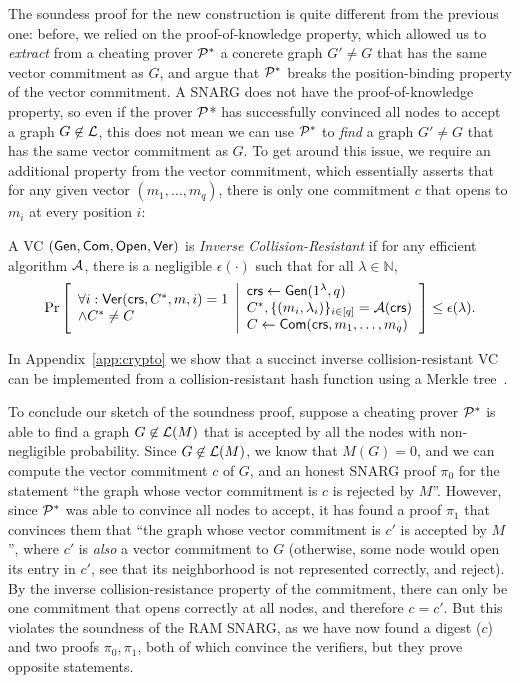 The soundess proof for the new construction is quite different from the previous one:
before, we relied on the proof-of-knowledge property, which allowed us to \emph{extract}
from a cheating prover $\mathcal{P}^*$
a concrete graph $G' \neq G$ that has the same vector commitment as $G$,
and argue that $\mathcal{P}^*$ breaks the position-binding property of the vector commitment.
A SNARG does not have the proof-of-knowledge property,
so even if the prover $\mathcal{P}$* has successfully convinced all nodes to accept a graph $G \not \in \mathcal{L}$,
this does not mean we can use $\mathcal{P}^*$ to \emph{find} a graph $G' \neq G$ that has the same vector commitment as $G$.
To get around this issue,
we require an additional property from the vector commitment,
which essentially asserts that for any given vector $(m_1,\ldots,m_q)$,
there is only one commitment $c$ that opens to $m_i$ at every position $i$:
\begin{definition}
A VC $(\mathsf{Gen}, \mathsf{Com}, \mathsf{Open}, \mathsf{Ver})$ is \emph{Inverse Collision-Resistant} if for any efficient algorithm $\mathcal{A}$, there
is a negligible $\epsilon(\cdot)$ such that for all $\lambda\in \mathbb{N}$,
\begin{gather*}
    \underset{}{\text{Pr}}\left [
    \begin{array}{ll}
         \forall i: \mathsf{Ver}(\mathsf{crs}, C^*, m, i) = 1 \\
         \wedge C^* \neq C
    \end{array}
    \middle\vert
    \begin{array}{ll}
         \mathsf{crs} \leftarrow \mathsf{Gen}(1^\lambda, q) \\
         C^*, \{(m_i, \lambda_i)\}_{i\in [q]} = \mathcal{A}(\mathsf{crs}) \\
         C \leftarrow \mathsf{Com}(\mathsf{crs}, m_1,\ldots,m_q)
    \end{array}
    \right ] \leq \epsilon(\lambda).
\end{gather*}
\end{definition}
In Appendix~\ref{app:crypto} we show that a succinct inverse collision-resistant VC can be implemented from 
a collision-resistant hash function using a Merkle tree~\cite{merkle1989certified}.

To conclude our sketch of the soundness proof, suppose a cheating prover $\mathcal{P}^*$ is able
to
find a graph $G \not \in \mathcal{L}(M)$ that is accepted by all the nodes with non-negligible probability.
Since $G \not \in \mathcal{L}(M)$, we know that $M(G) = 0$,
and we can compute the vector commitment $c$ of $G$,
and an honest SNARG proof $\pi_0$ for the statement ``the graph whose vector commitment is $c$
is rejected by $M$''.
However, since $\mathcal{P}^*$ was able to convince all nodes to accept,
it has found a proof $\pi_1$ that convinces them that ``the graph whose vector commitment is $c'$
is accepted by $M$'', where $c'$ is \emph{also} a vector commitment to $G$
(otherwise, some node would open its entry in $c'$, see that its neighborhood is not represented correctly, and reject).
By the inverse collision-resistance property of the commitment,
there can only be one commitment that opens correctly at all nodes, and therefore $c = c'$.
But this violates the soundness of the RAM SNARG, as we have now found a digest ($c$)
and two proofs $\pi_0, \pi_1$,
both of which convince the verifiers,
but they prove opposite statements.

